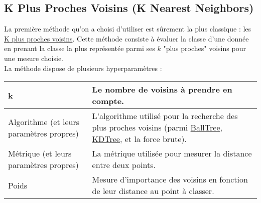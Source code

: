 \subsection{K Plus Proches Voisins (K Nearest Neighbors)}

La première méthode qu'on a choisi d'utiliser est sûrement la plus classique : les \href{https://scikit-learn.org/stable/modules/generated/sklearn.neighbors.KNeighborsClassifier.html}{K plus proches voisins}. Cette méthode consiste à évaluer la classe d'une donnée en prenant la classe la plus représentée parmi ses $k$ "plus proches" voisins pour une mesure choisie.\\

La méthode dispose de plusieurs hyperparamètres :

\noindent
\begin{tabularx}{\textwidth}{|X|X|}
    \hline
    k & Le nombre de voisins à prendre en compte.\\\hline
    Algorithme (et leurs paramètres propres) & L'algorithme utilisé pour la recherche des plus proches voisins (parmi \href{https://scikit-learn.org/stable/modules/generated/sklearn.neighbors.BallTree.htm}{BallTree}, \href{https://scikit-learn.org/stable/modules/generated/sklearn.neighbors.KDTree.html}{KDTree}, et la force brute). \\\hline
    Métrique (et leurs paramètres propres) & La métrique utilisée pour mesurer la distance entre deux points. \\\hline
    Poids & Mesure d'importance des voisins en fonction de leur distance au point à classer.\\\hline
\end{tabularx}